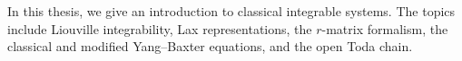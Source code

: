 In this thesis, we give an introduction to classical integrable systems. The topics include Liouville integrability, Lax representations, the $r$-matrix formalism, the classical and modified Yang--Baxter equations, and the open Toda chain.